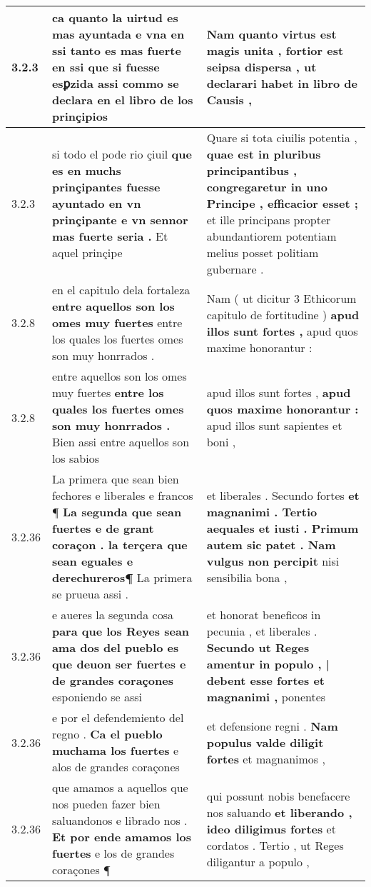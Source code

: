 \begin{tabular}{|p{1cm}|p{6.5cm}|p{6.5cm}|}
3.2.3 & ca quanto la uirtud es mas ayuntada \textbf{ e vna en ssi tanto es mas fuerte en ssi que si fuesse esꝑzida } assi commo se declara en el libro de los prinçipios & Nam quanto virtus est magis unita , \textbf{ fortior est seipsa dispersa , } ut declarari habet in libro de Causis , \\\hline
3.2.3 & si todo el pode rio çiuil \textbf{ que es en muchs prinçipantes fuesse ayuntado en vn prinçipante e vn sennor mas fuerte seria . } Et aquel prinçipe & Quare si tota ciuilis potentia , \textbf{ quae est in pluribus principantibus , congregaretur in uno Principe , efficacior esset ; } et ille principans propter abundantiorem potentiam melius posset politiam gubernare . \\\hline
3.2.8 & en el capitulo dela fortaleza \textbf{ entre aquellos son los omes muy fuertes } entre los quales los fuertes omes son muy honrrados . & Nam ( ut dicitur 3 Ethicorum capitulo de fortitudine ) \textbf{ apud illos sunt fortes , } apud quos maxime honorantur : \\\hline
3.2.8 & entre aquellos son los omes muy fuertes \textbf{ entre los quales los fuertes omes son muy honrrados . } Bien assi entre aquellos son los sabios & apud illos sunt fortes , \textbf{ apud quos maxime honorantur : } apud illos sunt sapientes et boni , \\\hline
3.2.36 & La primera que sean bien fechores e liberales e francos ¶ \textbf{ La segunda que sean fuertes e de grant coraçon . la terçera que sean eguales e derechureros¶ } La primera se prueua assi . & et liberales . Secundo fortes \textbf{ et magnanimi . Tertio aequales et iusti . Primum autem sic patet . Nam vulgus non percipit } nisi sensibilia bona , \\\hline
3.2.36 & e aueres la segunda cosa \textbf{ para que los Reyes sean ama dos del pueblo es que deuon ser fuertes e de grandes coraçones } esponiendo se assi & et honorat beneficos in pecunia , et liberales . \textbf{ Secundo ut Reges amentur in populo , | debent esse fortes et magnanimi , } ponentes \\\hline
3.2.36 & e por el defendemiento del regno . \textbf{ Ca el pueblo muchama los fuertes } e alos de grandes coraçones & et defensione regni . \textbf{ Nam populus valde diligit fortes } et magnanimos , \\\hline
3.2.36 & que amamos a aquellos que nos pueden fazer bien saluandonos e librado nos . \textbf{ Et por ende amamos los fuertes } e los de grandes coraçones ¶ & qui possunt nobis benefacere nos saluando \textbf{ et liberando , ideo diligimus fortes } et cordatos . Tertio , ut Reges diligantur a populo , \\\hline

\end{tabular}
